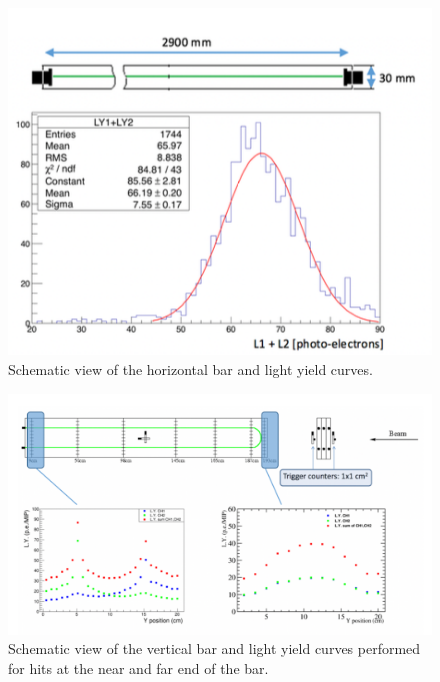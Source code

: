 \begin{figure}[h!]
\centering
\includegraphics[width=\textwidth]{figures/horizontal.png}
\caption{Schematic view of the horizontal bar and light yield curves.}
\label{fig:horizontal}
\end{figure}


\begin{figure}[h!]
\centering
\includegraphics[width=\textwidth]{figures/vertical.png}
\caption{Schematic view of the vertical bar and light yield curves performed for hits at the near and far end of the bar.}
\label{fig:vertical}
\end{figure}



